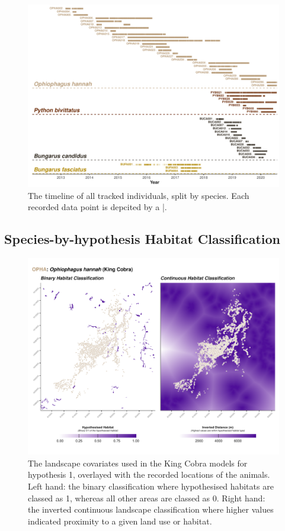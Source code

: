 \documentclass[10pt,a4paper]{article}
\begin{document}
\begin{figure}
\includegraphics[width=1\linewidth]{../../figures/timeLinePlot} \caption{The timeline of all tracked individuals, split by species. Each recorded data point is depcited by a |.}\label{fig:timeLinePlot}
\end{figure}

\subsection{Species-by-hypothesis Habitat Classification}\label{species-by-hypothesis-habitat-classification}

\begin{figure}
\includegraphics[width=1\linewidth]{../../figures/landscape_plot_OPHA_H1} \caption{The landscape covariates used in the King Cobra models for hypothesis 1, overlayed with the recorded locations of the animals. Left hand: the binary classification where hypothesised habitats are classed as 1, whereas all other areas are classed as 0. Right hand: the inverted continuous landscape classification where higher values indicated proximity to a given land use or habitat.}\label{fig:landscapePlotOPHA1}
\end{figure}
\end{document}
